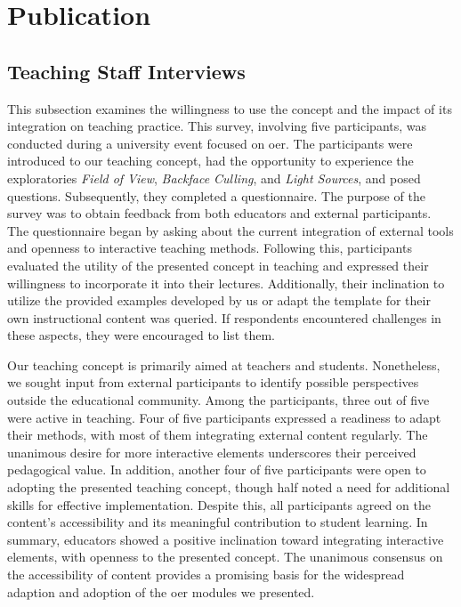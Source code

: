 \section{Publication\label{sec:publication}}

\subsection{Teaching Staff Interviews}%
This subsection examines the willingness to use the concept and the impact of its integration on teaching practice. This survey, involving five participants, was conducted during a university event focused on \acrshort{oer}. The participants were introduced to our teaching concept, had the opportunity to experience the exploratories \emph{Field of View}, \emph{Backface Culling}, and \emph{Light Sources}, and posed questions. Subsequently, they completed a questionnaire.
The purpose of the survey was to obtain feedback from both educators and external participants. The questionnaire began by asking about the current integration of external tools and openness to interactive teaching methods. Following this, participants evaluated the utility of the presented concept in teaching and expressed their willingness to incorporate it into their lectures. Additionally, their inclination to utilize the provided examples developed by us or adapt the template for their own instructional content was queried. If respondents encountered challenges in these aspects, they were encouraged to list them.

Our teaching concept is primarily aimed at teachers and students. Nonetheless, we sought input from external participants to identify possible perspectives outside the educational community. Among the participants, three out of five were active in teaching. Four of five participants expressed a readiness to adapt their methods, with most of them integrating external content regularly. The unanimous desire for more interactive elements underscores their perceived pedagogical value.
In addition, another four of five participants were open to adopting the presented teaching concept, though half noted a need for additional skills for effective implementation. Despite this, all participants agreed on the content's accessibility and its meaningful contribution to student learning.
In summary, educators showed a positive inclination toward integrating interactive elements, with openness to the presented concept. The unanimous consensus on the accessibility of content provides a promising basis for the widespread adaption and adoption of the \acrshort{oer} modules we presented.


